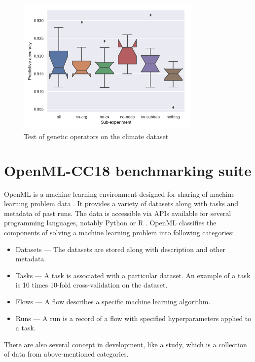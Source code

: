 \begin{figure}[pt]\centering
\includegraphics[width=0.8\textwidth]{../img/climate-mut-redo.png}
\caption{Test of genetic operators on the climate dataset}
\label{pic04:mut-climate}
\end{figure}

\section{OpenML-CC18 benchmarking suite} \label{sec:exp:openml}

OpenML is a machine learning environment designed for sharing of machine
learning problem data \citep{OpenML2013}. It provides a variety of datasets
along with tasks and metadata of past runs. The data is accessible via APIs
available for several programming languages, notably Python or R
\citep{openmlcc18docs}. OpenML classifies the components of solving a
machine learning problem into following categories:
\begin{itemize}
\item Datasets --- The datasets are stored along with description and other
metadata.
\item Tasks --- A task is associated with a particular dataset. An example of a
task is 10 times 10-fold cross-validation on the dataset.
\item Flows --- A flow describes a specific machine learning algorithm.
\item Runs --- A run is a record of a flow with specified hyperparameters
applied to a task.
\end{itemize}
There are also several concept in development, like a study, which is a
collection of data from above-mentioned categories.


